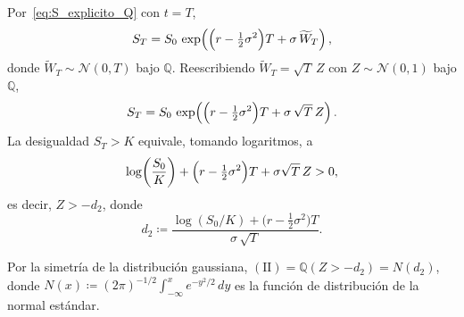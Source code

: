 \documentclass[11pt,a4paper,oneside]{report}
\theoremstyle{plain}
\theoremstyle{definition}
\theoremstyle{remark}
\newcommand{\Q}{\mathbb{Q}}
\newcommand{\1}{\mathbf{1}}
\newcommand{\eqdef}{\coloneqq}
\begin{document}
Por~\eqref{eq:S_explicito_Q} con $t = T$,
\begin{equation}\label{eq:S_T_Q}
  S_T = S_0\, \exp\!\left(\Bigl(r - \tfrac{1}{2}\sigma^2\Bigr) T
                          + \sigma\, \widetilde W_T\right),
\end{equation}
donde $\widetilde W_T \sim \mathcal{N}(0, T)$ bajo $\Q$. Reescribiendo
$\widetilde W_T = \sqrt{T}\, Z$ con $Z \sim \mathcal{N}(0, 1)$ bajo
$\Q$,
\begin{equation*}
  S_T = S_0\, \exp\!\left(\Bigl(r - \tfrac{1}{2}\sigma^2\Bigr) T
                          + \sigma\, \sqrt{T}\, Z\right).
\end{equation*}
La desigualdad $S_T > K$ equivale, tomando logaritmos, a
\begin{equation*}
  \log\!\left(\frac{S_0}{K}\right)
  + \Bigl(r - \tfrac{1}{2}\sigma^2\Bigr) T
  + \sigma\sqrt{T}\, Z > 0,
\end{equation*}
es decir, $Z > -d_2$, donde
\begin{equation}\label{eq:def_d2}
  d_2 \eqdef \frac{\log(S_0/K) + \bigl(r - \tfrac{1}{2}\sigma^2\bigr) T}
                  {\sigma\, \sqrt{T}}.
\end{equation}

Por la simetría
de la distribución gaussiana, $(\mathrm{II}) = \Q(Z > -d_2) = N(d_2)$,
donde $N(x) \eqdef (2\pi)^{-1/2} \int_{-\infty}^x e^{-y^2/2}\, dy$ es
la función de distribución de la normal estándar.
\end{document}
